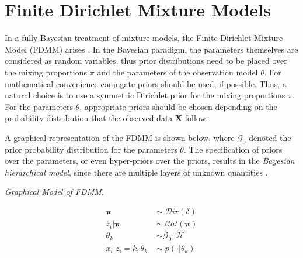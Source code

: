 \section{Finite Dirichlet Mixture Models} \label{back-fdmm-s}
In a fully Bayesian treatment of mixture models, the Finite Dirichlet Mixture Model (FDMM) arises \citep{Diebolt1994}. In the Bayesian paradigm, the parameters themselves are considered as random variables, thus prior distributions need to be placed over the mixing proportions $\pi$ and the parameters of the observation model $\theta$. For mathematical convenience conjugate priors should be used, if possible. Thus, a natural choice is to use a symmetric Dirichlet prior for the mixing proportions $\pi$. For the parameters $\theta$, appropriate priors should be chosen depending on the probability distribution that the observed data $\mathbf{X}$ follow.

A graphical representation of the FDMM is shown below, where $\mathcal{G}_{0}$ denoted the prior probability distribution for the parameters $\theta$. The specification of priors over the parameters, or even hyper-priors over the priors, results in the \emph{Bayesian hierarchical model}, since there are multiple layers of unknown quantities \cite{Richardson1997}. 

\begin{minipage}{0.6\textwidth}%
  \hfill
  \begin{center}
	
	\emph{Graphical Model of FDMM.}
  \end{center}
\end{minipage}
\begin{minipage}{0.1\textwidth}%
  \begin{equation*}
  	\begin{aligned}
  		\mathbf{\pi} \; & \sim \; \mathcal{D}ir(\delta) \\
  		z_{i}|\mathbf{\pi} \; & \sim \; \mathcal{C}at(\mathbf{\pi}) \\
  		\theta_{k} \; & \sim \mathcal{G}_{0}; \mathcal{H} \\
  		x_{i}|z_{i}=k,\theta_{k} \; & \sim \; p(\cdot | \theta_{k})  
  	\end{aligned} 
  \end{equation*} 
\end{minipage}


